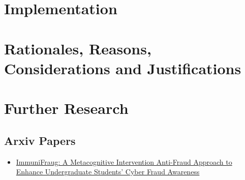 \documentclass{article}
\begin{document}
\section{Implementation}



\break{}

\begin{appendices}
\section{Rationales, Reasons, Considerations and Justifications}







\section{Further Research}

\subsection{Arxiv Papers}

\begin{itemize}
    \item \href{https://arxiv.org/abs/2601.06774}{ImmuniFraug: A Metacognitive Intervention Anti-Fraud Approach to Enhance Undergraduate Students' Cyber Fraud Awareness}
\end{itemize}

\end{appendices}    
\end{document}
